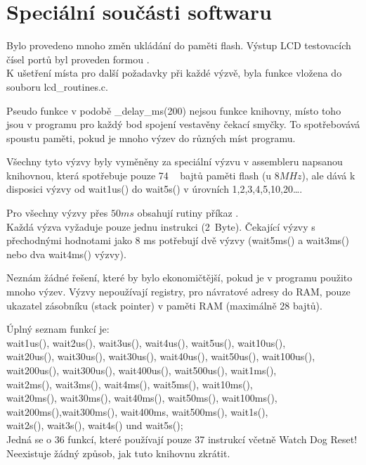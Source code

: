 \chapter{Speciální součásti softwaru}
Bylo provedeno mnoho změn ukládání do paměti flash.
Výstup LCD testovacích čísel portů byl proveden formou .
\\K ušetření místa pro další požadavky při každé výzvě, byla funkce  vložena do souboru lcd\_routines.c.

Pseudo funkce v podobě \_delay\_ms(200) nejsou funkce knihovny,
místo toho jsou v programu pro každý bod spojení vestavěny čekací smyčky.
To spotřebovává spoustu paměti, pokud je mnoho výzev do různých míst programu.

Všechny tyto výzvy byly vyměněny za speciální výzvu v assembleru napsanou knihovnou,
která spotřebuje pouze 74 ~ bajtů paměti flash (u \(8MHz\)),  ale
dává k disposici výzvy od wait1us() do wait5s() v úrovních 1,2,3,4,5,10,20\dots.

Pro všechny výzvy přes \(50ms\) obsahují rutiny příkaz .
\\Každá výzva vyžaduje pouze jednu instrukci (2~Byte). Čekající výzvy s přechodnými hodnotami
jako 8 ms potřebují dvě výzvy (wait5ms() a wait3ms() nebo dva wait4ms() výzvy).

Neznám žádné řešení, které by bylo ekonomičtější, pokud je v programu použito mnoho výzev.
Výzvy nepoužívají registry, pro návratové adresy do RAM, pouze ukazatel zásobníku (stack pointer)
v paměti RAM (maximálně 28 bajtů).

Úplný seznam funkcí je:\\
wait1us(), wait2us(), wait3us(), wait4us(), wait5us(), wait10us(), \\
wait20us(), wait30us(), wait30us(), wait40us(), wait50us(), wait100us(), \\
wait200us(), wait300us(), wait400us(), wait500us(), wait1ms(),\\
wait2ms(), wait3ms(), wait4ms(), wait5ms(), wait10ms(),\\
wait20ms(), wait30ms(), wait40ms(), wait50ms(), wait100ms(),\\
wait200ms(),wait300ms(), wait400ms, wait500ms(), wait1s(),\\
wait2s(), wait3s(), wait4s() und wait5s();\\

Jedná se o 36 funkcí, které používají pouze 37 instrukcí včetně Watch Dog Reset!
\\Neexistuje žádný způsob, jak tuto knihovnu zkrátit.\\

